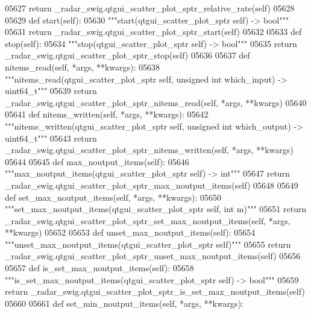\begin{DoxyCode}
{{{{{{{{{{{{{{{{{{{05627         \textcolor{keywordflow}{return} \_radar\_swig.qtgui\_scatter\_plot\_sptr\_relative\_rate(self)
05628 
05629     \textcolor{keyword}{def }start(self):
05630         \textcolor{stringliteral}{"""start(qtgui\_scatter\_plot\_sptr self) -> bool"""}
05631         \textcolor{keywordflow}{return} \_radar\_swig.qtgui\_scatter\_plot\_sptr\_start(self)
05632 
05633     \textcolor{keyword}{def }stop(self):
05634         \textcolor{stringliteral}{"""stop(qtgui\_scatter\_plot\_sptr self) -> bool"""}
05635         \textcolor{keywordflow}{return} \_radar\_swig.qtgui\_scatter\_plot\_sptr\_stop(self)
05636 
05637     \textcolor{keyword}{def }nitems_read(self, *args, **kwargs):
05638         \textcolor{stringliteral}{"""nitems\_read(qtgui\_scatter\_plot\_sptr self, unsigned int which\_input) -> uint64\_t"""}
05639         \textcolor{keywordflow}{return} \_radar\_swig.qtgui\_scatter\_plot\_sptr\_nitems\_read(self, *args, **kwargs)
05640 
05641     \textcolor{keyword}{def }nitems_written(self, *args, **kwargs):
05642         \textcolor{stringliteral}{"""nitems\_written(qtgui\_scatter\_plot\_sptr self, unsigned int which\_output) -> uint64\_t"""}
05643         \textcolor{keywordflow}{return} \_radar\_swig.qtgui\_scatter\_plot\_sptr\_nitems\_written(self, *args, **kwargs)
05644 
05645     \textcolor{keyword}{def }max_noutput_items(self):
05646         \textcolor{stringliteral}{"""max\_noutput\_items(qtgui\_scatter\_plot\_sptr self) -> int"""}
05647         \textcolor{keywordflow}{return} \_radar\_swig.qtgui\_scatter\_plot\_sptr\_max\_noutput\_items(self)
05648 
05649     \textcolor{keyword}{def }set_max_noutput_items(self, *args, **kwargs):
05650         \textcolor{stringliteral}{"""set\_max\_noutput\_items(qtgui\_scatter\_plot\_sptr self, int m)"""}
05651         \textcolor{keywordflow}{return} \_radar\_swig.qtgui\_scatter\_plot\_sptr\_set\_max\_noutput\_items(self, *args, **kwargs)
05652 
05653     \textcolor{keyword}{def }unset_max_noutput_items(self):
05654         \textcolor{stringliteral}{"""unset\_max\_noutput\_items(qtgui\_scatter\_plot\_sptr self)"""}
05655         \textcolor{keywordflow}{return} \_radar\_swig.qtgui\_scatter\_plot\_sptr\_unset\_max\_noutput\_items(self)
05656 
05657     \textcolor{keyword}{def }is_set_max_noutput_items(self):
05658         \textcolor{stringliteral}{"""is\_set\_max\_noutput\_items(qtgui\_scatter\_plot\_sptr self) -> bool"""}
05659         \textcolor{keywordflow}{return} \_radar\_swig.qtgui\_scatter\_plot\_sptr\_is\_set\_max\_noutput\_items(self)
05660 
05661     \textcolor{keyword}{def }set_min_noutput_items(self, *args, **kwargs):
}}}}}}}}}}}}}}}}}}}
\end{DoxyCode}
